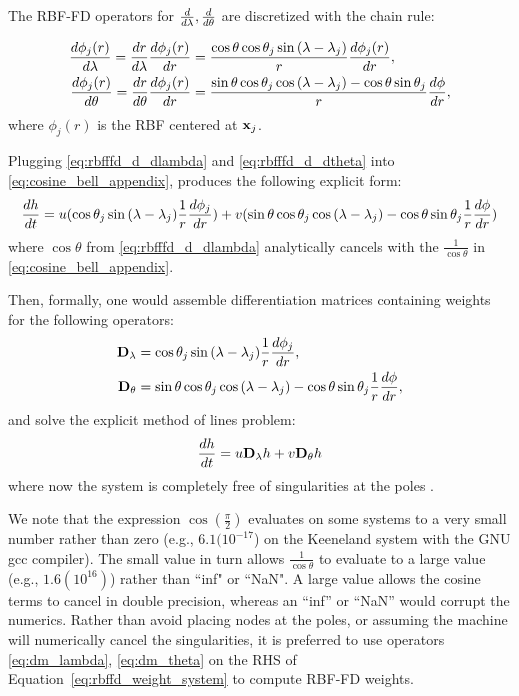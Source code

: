 The RBF-FD operators for $\frac{d }{d \lambda}, \frac{d }{d \theta}$ are discretized with the chain rule: 

\begin{align}
\frac{d \phi_{j}(r)}{d \lambda} = \frac{d r}{d \lambda} \frac{d \phi_{j}(r)}{d r} & = \frac{\cos{\theta}\cos{\theta_j}\sin{(\lambda - \lambda_j)}}{r} \frac{d \phi_j(r)}{d r}, \label{eq:rbfffd_d_dlambda} \\
\frac{d \phi_{j}(r)}{d \theta} = \frac{d r}{d \theta} \frac{d \phi_{j}(r)}{d r} & = \frac{\sin{\theta}\cos{\theta_j}\cos{(\lambda-\lambda_j)} - \cos{\theta}\sin{\theta_j}}{r} \frac{d \phi}{d r}, \label{eq:rbfffd_d_dtheta}
\end{align}
where $\phi_{j}(r)$ is the RBF centered at $\mathbf{x}_{j}$. 

Plugging \ref{eq:rbfffd_d_dlambda} and \ref{eq:rbfffd_d_dtheta} into \ref{eq:cosine_bell_appendix}, produces the following explicit form: 
\begin{align*}
\frac{d h}{d t} = u(\cos{\theta_j}\sin{(\lambda - \lambda_j)} \frac{1}{r} \frac{d \phi_j}{d r}) + v (\sin{\theta}\cos{\theta_j}\cos{(\lambda-\lambda_j)} - \cos{\theta}\sin{\theta_j} \frac{1}{r} \frac{d \phi}{d r}) 
\end{align*}
where $\cos{\theta}$ from \ref{eq:rbfffd_d_dlambda} analytically cancels with the $\frac{1}{\cos{\theta}}$ in \ref{eq:cosine_bell_appendix}.


Then, formally, one would assemble differentiation matrices containing weights for the following operators: 
\begin{align}
\mathbf{D}_\lambda & = \cos{\theta_j}\sin{(\lambda - \lambda_j)} \frac{1}{r} \frac{d \phi_j}{d r}, \label{eq:dm_lambda} \\
\mathbf{D}_\theta &=  \sin{\theta}\cos{\theta_j}\cos{(\lambda-\lambda_j)} - \cos{\theta}\sin{\theta_j} \frac{1}{r} \frac{d \phi}{d r}, \label{eq:dm_theta}
\end{align} 
and solve the explicit method of lines problem:
$$
\frac{d h}{d t} = u \mathbf{D}_\lambda h + v \mathbf{D}_\theta h
$$
where now the system is completely free of singularities at the poles \cite{FlyerWright09}. 

We note that the expression $\cos{(\frac{\pi}{2})}$ evaluates on some systems to a very small number rather than zero (e.g., $6.1(10^{-17}$) on the Keeneland system with the GNU gcc compiler). The small value in turn allows $\frac{1}{\cos{\theta}}$ to evaluate to a large value (e.g., $1.6(10^{16})$) rather than ``inf" or ``NaN". A large value allows the cosine terms to cancel in double precision, whereas an ``inf'' or ``NaN'' would corrupt the numerics. Rather than avoid placing nodes at the poles, or assuming the machine will numerically cancel the singularities, it is preferred to use operators \ref{eq:dm_lambda}, \ref{eq:dm_theta} on the RHS of Equation~\ref{eq:rbffd_weight_system} to compute RBF-FD weights. 


%
%
%
%
